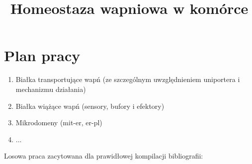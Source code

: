 \documentclass[12pt,a4paper, draft]{article}
\title{Homeostaza wapniowa w komórce}
\author{}
\begin{document}
	\maketitle
	\tableofcontents




\section{Plan pracy}

\begin{enumerate}
	\item Białka transportujące wapń (ze szczególnym uwzględnieniem uniportera i mechanizmu działania)
	\item Białka wiążące wapń (sensory, bufory i efektory)
	\item Mikrodomeny (mit-er, er-pl)
	\item ...
\end{enumerate}


Losowa praca zacytowana dla prawidłowej kompilacji bibliografii: \cite{Abu-Hamad2009}

\newpage

\end{document}
